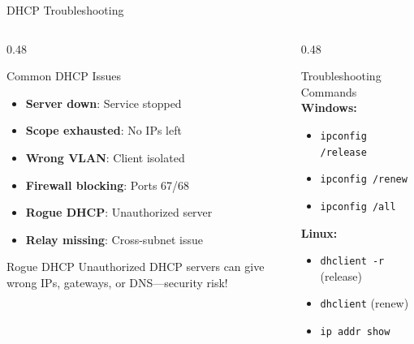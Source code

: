 \documentclass[aspectratio=169, 11pt]{beamer}
\begin{document}
\begin{frame}{DHCP Troubleshooting}
    \begin{columns}[T]
        \begin{column}{0.48\textwidth}
            \begin{block}{Common DHCP Issues}
                \small
                \begin{itemize}\setlength{\itemsep}{2pt}
                    \item \textbf{Server down}: Service stopped
                    \item \textbf{Scope exhausted}: No IPs left
                    \item \textbf{Wrong VLAN}: Client isolated
                    \item \textbf{Firewall blocking}: Ports 67/68
                    \item \textbf{Rogue DHCP}: Unauthorized server
                    \item \textbf{Relay missing}: Cross-subnet issue
                \end{itemize}
            \end{block}
            
            \vspace{0.2em}
            \begin{alertblock}{Rogue DHCP}
                \small
                Unauthorized DHCP servers can give wrong IPs, gateways, or DNS---security risk!
            \end{alertblock}
        \end{column}
        \begin{column}{0.48\textwidth}
            \begin{block}{Troubleshooting Commands}
                \scriptsize
                \textbf{Windows:}
                \begin{itemize}\setlength{\itemsep}{1pt}
                    \item \texttt{ipconfig /release}
                    \item \texttt{ipconfig /renew}
                    \item \texttt{ipconfig /all}
                \end{itemize}
                
                \vspace{0.2em}
                \scriptsize
                \textbf{Linux:}
                \begin{itemize}\setlength{\itemsep}{1pt}
                    \item \texttt{dhclient -r} (release)
                    \item \texttt{dhclient} (renew)
                    \item \texttt{ip addr show}
                \end{itemize}
            \end{block}
            

\end{column}
\end{columns}
\end{frame}
\end{document}

